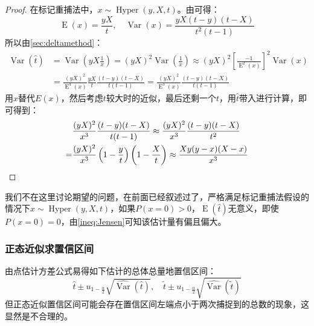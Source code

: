 \begin{proof}
	在标记重捕法中，$x\sim\operatorname{Hyper}(y,X,t)$。由可得：
	\begin{equation*}
		\operatorname{E}(x)=\frac{yX}{t},\quad
		\operatorname{Var}(x)=\frac{yX(t-y)(t-X)}{t^2(t-1)}
	\end{equation*}
	所以由\cref{sec:deltamethod}：
	\begin{align*}
		\operatorname{Var}(\hat{t})&=\operatorname{Var}\left(yX\frac{1}{x}\right)=(yX)^2\operatorname{Var}\left(\frac{1}{x}\right)\approx(yX)^2\left[\frac{-1}{\operatorname{E}^2(x)}\right]^2\operatorname{Var}(x) \\
		&=\frac{(yX)^2}{\operatorname{E}^4(x)}\frac{yX}{t}\frac{(t-y)(t-X)}{t(t-1)}=\frac{(yX)^2}{\operatorname{E}^3(x)}\frac{(t-y)(t-X)}{t(t-1)}
	\end{align*}
	用$x$替代$E(x)$，然后考虑$t$较大时的近似，最后还剩一个$t$，用$\hat{t}$带入进行计算，即可得到：
	\begin{align*}
		&\frac{(yX)^2}{x^3}\frac{(t-y)(t-X)}{t(t-1)} \approx\frac{(yX)^2}{x^3}\frac{(t-y)(t-X)}{t^2} \\
		=&\frac{(yX)^2}{x^3}\left(1-\frac{y}{t}\right)\left(1-\frac{X}{t}\right) \approx\frac{Xy(y-x)(X-x)}{x^3}\qedhere
	\end{align*}
\end{proof}
\begin{note}
	我们不在这里讨论期望的问题，在前面已经叙述过了，严格满足标记重捕法假设的情况下$x\sim\operatorname{Hyper}(y,X,t)$，如果$P(x=0)>0$，$\operatorname{E}(\hat{t})$无意义，即使$P(x=0)=0$，由\cref{ineq:Jensen}可知该估计量有偏且偏大。
\end{note}
\subsubsection{正态近似求置信区间}
由点估计方差公式易得如下估计的总体总量地置信区间：
\begin{equation*}
	\hat{t}\pm u_{1-\frac{\alpha}{2}}\sqrt{\widehat{\operatorname{Var}}(\hat{t})},\quad
	\tilde{t}\pm u_{1-\frac{\alpha}{2}}\sqrt{\widehat{\operatorname{Var}}(\tilde{t})}
\end{equation*}
但正态近似置信区间可能会存在置信区间左端点小于两次捕捉到的总数的现象，这显然是不合理的。
